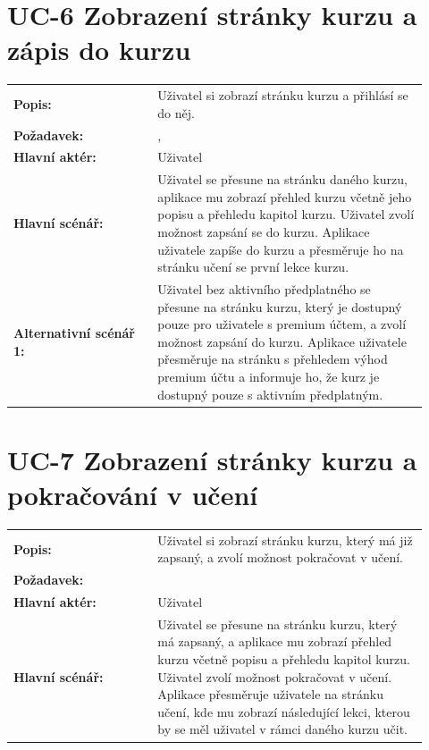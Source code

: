 \section{UC-6 Zobrazení stránky kurzu a zápis do kurzu}\label{sec:uc-6}

\begin{tabular}{p{0.32\linewidth}p{0.6\linewidth}}
  \textbf{Popis:} & Uživatel si zobrazí stránku kurzu a přihlásí se do něj. \\
  \textbf{Požadavek:} & \nameref{sec:fp-course-page}, \nameref{sec:fp-subscription-system} \\
  \textbf{Hlavní aktér:} & Uživatel \\
  \textbf{Hlavní scénář:} & Uživatel se přesune na stránku daného kurzu, aplikace mu zobrazí přehled kurzu včetně jeho popisu a přehledu kapitol kurzu. Uživatel zvolí možnost zapsání se do kurzu. Aplikace uživatele zapíše do kurzu a přesměruje ho na stránku učení se první lekce kurzu. \\
  \textbf{Alternativní scénář 1:} & Uživatel bez aktivního předplatného se přesune na stránku kurzu, který je dostupný pouze pro uživatele s premium účtem, a zvolí možnost zapsání do kurzu. Aplikace uživatele přesměruje na stránku s přehledem výhod premium účtu a informuje ho, že kurz je dostupný pouze s aktivním předplatným. \\
\end{tabular}

\section{UC-7 Zobrazení stránky kurzu a pokračování v učení}\label{sec:uc-7}

\begin{tabular}{p{0.32\linewidth}p{0.6\linewidth}}
  \textbf{Popis:} & Uživatel si zobrazí stránku kurzu, který má již zapsaný, a zvolí možnost pokračovat v učení. \\
  \textbf{Požadavek:} & \nameref{sec:fp-course-page} \\
  \textbf{Hlavní aktér:} & Uživatel \\
  \textbf{Hlavní scénář:} & Uživatel se přesune na stránku kurzu, který má zapsaný, a aplikace mu zobrazí přehled kurzu včetně popisu a přehledu kapitol kurzu. Uživatel zvolí možnost pokračovat v učení. Aplikace přesměruje uživatele na stránku učení, kde mu zobrazí následující lekci, kterou by se měl uživatel v rámci daného kurzu učit. \\
\end{tabular}

